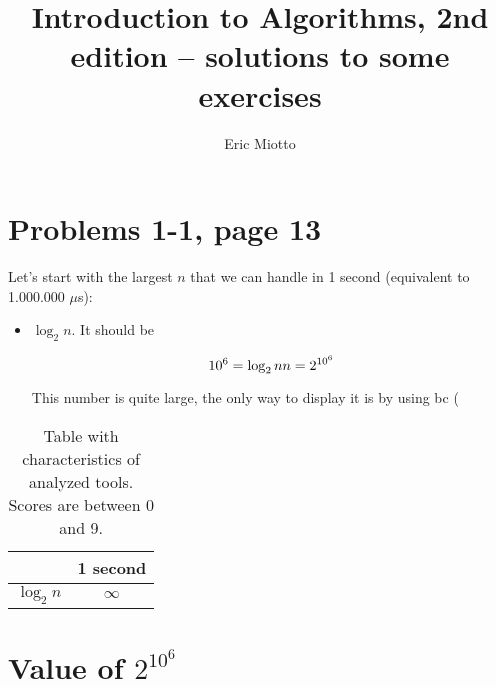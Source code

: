 



\author{Eric Miotto}
\title{Introduction to Algorithms, 2nd edition -- solutions to some exercises}


\maketitle
\tableofcontents
\newpage

\section{Problems 1-1, page 13}

Let's start with the largest $n$ that we can handle in 1 second (equivalent to 1.000.000 $\mu$s):%

\begin{itemize}
 \item $\log_2 n$. It should be
 
 
\begin{equation}
 10^6=\log_2 n \\
 n=2^{10^6}
\end{equation}

This number is quite large, the only way to display it is by using bc (
\end{itemize}

\begin{table}[!t]
\begin{center}
\begin{tabular}{cc}
\toprule
& 1 second \\
\midrule

$\log_2 n$ & $\infty$ \\
\bottomrule
\end{tabular}
\end{center}
\caption{Table with characteristics of analyzed tools. Scores are between 0 and 9.}
\label{table_scores}
\end{table}

\section{Value of $2^{10^6}$}



